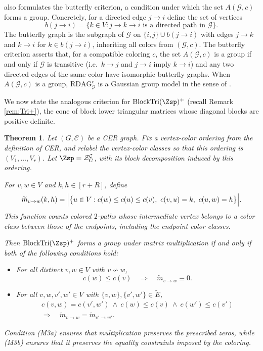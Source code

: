 \documentclass[12pt]{amsart}
\theoremstyle{plain}
\newtheorem{theorem}{Theorem}[section]
\theoremstyle{definition}
\theoremstyle{remark}
\newcommand{\1}{\mathbf{1}}
\newcommand{\coloredZ}{\mathcal{Z}_{G}^{\mathcal{C}}}
\newcommand{\tri}{\mathrm{BlockTri}}
\begin{document}
\citet[Proposition~B.2]{Seigal23} also formulates the butterfly criterion, a condition under which the set $A(\mathcal{G},c)$ forms a group.
Concretely, for a directed edge $j\to i$ define the set of vertices
\[
b(j\to i) = \{k\in V \colon j\to k\to i \text{ is a directed path in }\mathcal{G}\}.
\]
The butterfly graph is the subgraph of $\mathcal{G}$ on $\{i,j\}\cup b(j\to i)$ with edges $j\to k$ and $k\to i$ for $k\in b(j\to i)$, inheriting all colors from $(\mathcal{G},c)$. The butterfly criterion asserts that, for a compatible coloring $c$, the set $A(\mathcal{G},c)$ is a group if and only if $\mathcal{G}$ is transitive (i.e.\ $k\to j$ and $j\to i$ imply $k\to i$) and any two directed edges of the same color have isomorphic butterfly graphs. When $A(\mathcal G,c)$ is a group, $\mathrm{RDAG}_{\mathcal G}^c$ is a Gaussian group model in the sense of \citet{GGM}. 

We now state the analogous criterion for $\tri(\Zsp)^+$ (recall Remark \ref{rem:Tri+}), the cone of block lower triangular matrices whose diagonal blocks are positive definite.

\begin{theorem}\label{thm:group}
Let $(G,\mathcal C)$ be a CER graph. Fix a vertex-color ordering from the definition of CER, and relabel the vertex-color classes so that this ordering is $(V_1,\ldots,V_r)$. Let $\Zsp=\coloredZ$, with its block decomposition induced by this ordering.

For $v,w\in V$ and $k,h\in[r+R]$, define
\[
\widetilde m_{v\to w}(k,h)
=\Bigl|\bigl\{u\in V:
c(w)\leq c(u)\leq c(v),\ c(v,u)=k,\ c(u,w)=h
\bigr\}\Bigr|.
\]
This function counts colored $2$-paths whose intermediate vertex belongs to a color class between those of the endpoints, including the endpoint color classes.

Then $\tri(\Zsp)^+$ forms a group under matrix multiplication if and only if both of the following conditions hold:
\begin{itemize}
\item[(M3a)] For all distinct $v,w\in V$ with $v\nsim w$,
\[
c(w)\leq c(v)
\quad\Longrightarrow\quad
\widetilde m_{v\to w}\equiv0.
\]
\item[(M3b)] For all $v,w,v',w'\in V$ with $\{v,w\},\{v',w'\}\in\tilde E$,
\[
\begin{gathered}
c(v,w)=c(v',w')
\ \land\ c(w)\leq c(v)\ \land\ c(w')\leq c(v')
\\
\Longrightarrow\quad
\widetilde m_{v\to w}=\widetilde m_{v'\to w'}.
\end{gathered}
\]
\end{itemize}
Condition (M3a) ensures that multiplication preserves the prescribed zeros, while (M3b) ensures that it preserves the equality constraints imposed by the coloring.
\end{theorem}
\end{document}
